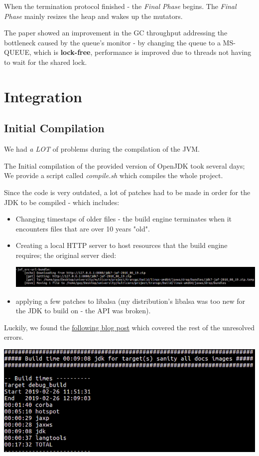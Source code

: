 \documentclass{article}
\begin{document}
 When the termination protocol finished - the \textit{Final Phase} begins. The \textit{Final Phase} mainly resizes the heap and wakes up the mutators.
 
 The paper showed an improvement in the GC throughput addressing the bottleneck caused by the queue's monitor - by changing the queue to a MS-QUEUE, which is \textbf{lock-free}, performance is improved due to threads not having to wait for the shared lock.

 \newpage

 \section{Integration}

 \subsection{Initial Compilation}
 We had \textit{a LOT} of problems during the compilation of the JVM.

 The Initial compilation of the provided version of OpenJDK took several days; We provide a script called \textit{compile.sh} which compiles the whole project.
 
 Since the code is very outdated, a lot of patches had to be made in order for the JDK to be compiled - which includes:
 \begin{itemize}
   \item Changing timestaps of older files - the build engine terminates when it encounters files that are over 10 years "old".
   \item Creating a local HTTP server to host resources that the build engine requires; the original server died:

   \includegraphics[width=\textwidth]{local_http_server.png}
   \item applying a few patches to libalsa (my distribution's libalsa was too new for the JDK to build on - the API was broken).
 \end{itemize}

 Luckily, we found the \href{http://www.voidcn.com/article/p-zayqisji-va.html}{following blog post} which covered the rest of the unresolved errors.

 \includegraphics[width=\textwidth]{initial_build.png}
\end{document}
